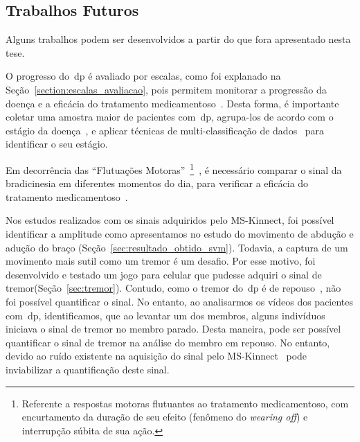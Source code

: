 \subsection{Trabalhos Futuros}\label{sec:trab_futuros}

Alguns trabalhos podem ser desenvolvidos a partir do que fora apresentado nesta tese.

O progresso do~\ac{dp} é avaliado por escalas, como foi explanado na Seção~\ref{section:escalas_avaliacao}, pois permitem monitorar a progressão da doença e a eficácia do tratamento medicamentoso~\cite{updrs87,goul05}. Desta forma, é importante coletar uma amostra maior de pacientes com~\ac{dp}, agrupa-los de acordo com o estágio da doença~\cite{goul05}, e aplicar técnicas de multi-classificação de dados~\cite{multisvm2011} para identificar o seu estágio.

Em decorrência das ``Flutuações Motoras''~\footnote{Referente a respostas motoras flutuantes ao tratamento medicamentoso, com encurtamento da duração de seu efeito (fenômeno do \textit{wearing off}) e interrupção súbita de sua ação.}~\cite{protpar010},  é necessário comparar o sinal da bradicinesia em diferentes momentos do dia, para verificar a eficácia do tratamento medicamentoso~\cite{protpar010}.

Nos estudos realizados com os sinais adquiridos pelo MS-Kinnect, foi possível identificar a amplitude como apresentamos no estudo do movimento de abdução e adução do braço (Seção~\ref{sec:resultado_obtido_svm}). Todavia, a captura de um movimento mais sutil como um tremor é um desafio. Por esse motivo, foi desenvolvido e testado um jogo para celular que pudesse adquiri o sinal de tremor(Seção~\ref{sec:tremor}). Contudo, como o tremor do~\ac{dp} é de repouso~\cite{protpar010}, não foi possível quantificar o sinal. No entanto, ao analisarmos os vídeos dos pacientes com~\ac{dp}, identificamos, que ao levantar um dos membros, alguns indivíduos iniciava o sinal de tremor no membro parado. Desta maneira, pode ser possível quantificar o sinal de tremor na análise do membro em repouso. No entanto, devido ao ruído existente na aquisição do sinal pelo MS-Kinnect~\cite{kinnect2013} pode inviabilizar a quantificação deste sinal.





